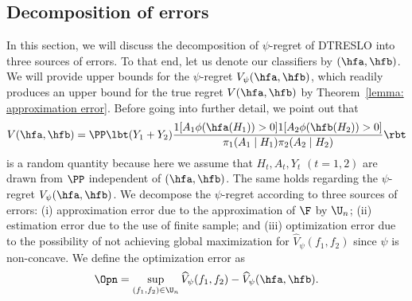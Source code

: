 \documentclass[preprint] {imsart}
\begin{document}
 \subsection{Decomposition of errors}
\label{sec: error decomposition}
In this section, we will discuss the decomposition of $\psi$-regret of DTRESLO into three sources of errors. 
To that end, let us denote our classifiers by $(\hfa, \hfb)$. 
We will provide upper bounds for the $\psi$-regret $V_\psi(\hfa,\hfb)$, which readily produces an upper bound for the true regret $V(\hfa,\hfb)$ by Theorem~\ref{lemma: approximation error}. 
Before going into further detail, we point out that
\[V(\hfa,\hfb)=\PP\lbt (Y_1+Y_2)\frac{1[A_1\phi(\hfa(H_1))>0]1[A_2\phi(\hfb(H_2))>0]}{\pi_1(A_1\mid H_1)\pi_2(A_2\mid H_2)} \rbt\]
is a random quantity because here we assume that $H_t,A_t,Y_t$ $(t=1,2)$ are  drawn from $\PP$  independent of $(\hfa,\hfb)$. The same holds regarding the $\psi$-regret $V_\psi(\hfa,\hfb)$.
We decompose the $\psi$-regret according to three sources of errors: (i) approximation error due to the approximation of $\F$ by $\U_n$; (ii) estimation error due to the use of finite sample; and (iii) optimization error due to the possibility of not achieving global maximization for $\widehat V_\psi(f_1,f_2)$  since $\psi$ is non-concave.   We define the optimization error  as
\[\Opn=\sup_{(f_1,f_2)\in\U_n}\widehat V_\psi(f_1,f_2)-\widehat V_\psi(\hfa,\hfb).\]
\end{document}
